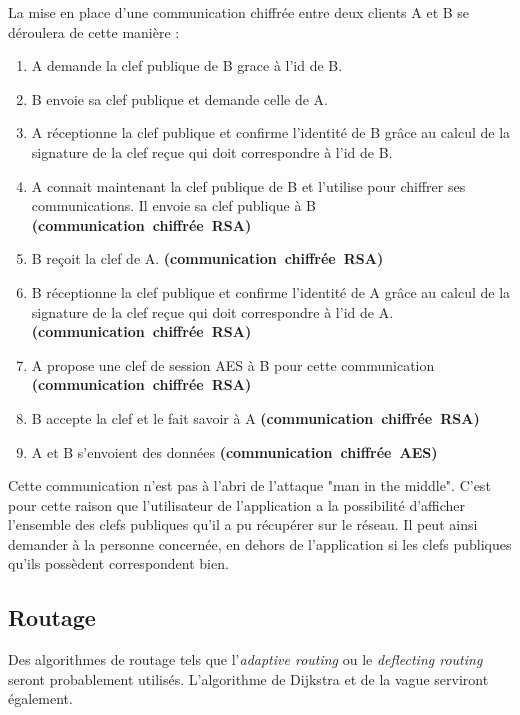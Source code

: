 \documentclass[french,11pt,a4]{article}
\begin{document}
La mise en place d'une communication chiffrée entre deux clients A et B se déroulera de cette manière :
\begin{enumerate}
\item{A demande la clef publique de B grace à l'id de B.}
\item{B envoie sa clef publique et demande celle de A.}
\item{A réceptionne la clef publique et confirme l'identité de B grâce au calcul de la signature de la clef reçue qui doit correspondre à l'id de B.}
\item{A connait maintenant la clef publique de B et l'utilise pour chiffrer ses communications. Il envoie sa clef publique à B \textbf{(communication~chiffrée~RSA)}}
\item{B reçoit la clef de A. \textbf{(communication~chiffrée~RSA)}}
\item{B réceptionne la clef publique et confirme l'identité de A grâce au calcul de la signature de la clef reçue qui doit correspondre à l'id de A. \textbf{(communication~chiffrée~RSA)}}
\item{A propose une clef de session AES à B pour cette communication \textbf{(communication~chiffrée~RSA)}}
\item{B accepte la clef et le fait savoir à A \textbf{(communication~chiffrée~RSA)}}
\item{A et B s'envoient des données \textbf{(communication~chiffrée~AES)}}
\end{enumerate}

Cette communication n'est pas à l'abri de l'attaque "man in the
middle". C'est pour cette raison que l'utilisateur de l'application a
la possibilité d'afficher l'ensemble des clefs publiques qu'il a pu
récupérer sur le réseau. Il peut ainsi demander à la personne
concernée, en dehors de l'application si les clefs publiques qu'ils
possèdent correspondent bien.

\subsection{Routage}

Des algorithmes de routage tels que l'\textit{adaptive routing} ou le \textit{deflecting routing} seront probablement utilisés. L'algorithme de Dijkstra et de la vague serviront également.
\end{document}
